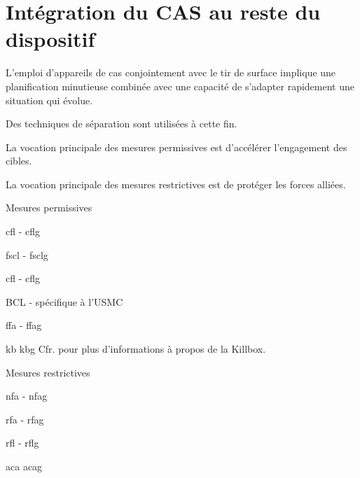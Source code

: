 \section{Intégration du CAS au reste du dispositif}

L'emploi d'appareils de \gls{cas} conjointement avec le tir de surface implique une planification minutieuse combinée avec une capacité de s'adapter rapidement une situation qui évolue.\par

Des techniques de séparation sont utilisées à cette fin.

\begin{e1}
	\item La vocation principale des mesures permissives est d'accélérer l'engagement des cibles.
	\item La vocation principale des mesures restrictives est de protéger les forces alliées.
	\begin{e2}
		\item Mesures permissives
		\begin{e3}
			\item {} \gls{cfl} - \glsdesc{cflg}
			\item {} \gls{fscl} - \glsdesc{fsclg}
			\item {} \gls{cfl} - \glsdesc{cflg}
			\item BCL - spécifique à l'USMC
			\item {} \gls{ffa} - \glsdesc{ffag}
			\item {} \gls{kb}\eskip{} \glsdesc{kbg}\eskip{} Cfr.  pour plus d'informations à propos de la Killbox.
		\end{e3}
		\item Mesures restrictives
		\begin{e3}
			\item {} \gls{nfa} - \glsdesc{nfag}
			\item {} \gls{rfa} - \glsdesc{rfag}
			\item {} \gls{rfl} - \glsdesc{rflg}
			\item {} \gls{aca}\eskip{} \glsdesc{acag}

\end{e3}
\end{e2}
\end{e1}
